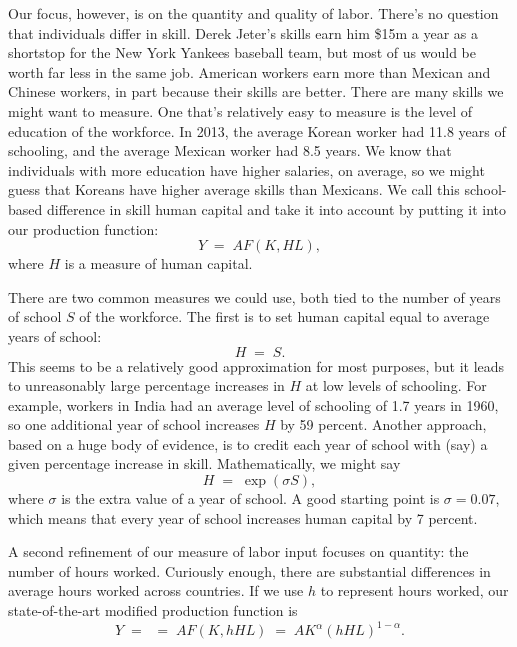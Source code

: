 Our focus, however, is on the quantity and quality of labor.
There's no question that individuals differ in skill.
Derek Jeter's skills earn him
\$15m a year as a shortstop for the New York Yankees baseball team,
but most of us would be worth far less in the same job.
American workers earn more than Mexican and Chinese workers,
in part because their skills are better.
There are many skills we might want to measure.
One that's relatively easy to measure is the level of education of the
workforce.
In 2013, the average Korean worker had 11.8 years of
schooling, and the average Mexican worker had 8.5 years. We know
that individuals with more education have higher salaries, on
average, so we might guess that Koreans have higher average skills
than Mexicans. We call this school-based difference in skill
human capital and take it into account by putting
it into our production function:
\[
    Y \;=\; A F(K,HL),
\]
where $H$ is a measure of human capital.


There are two common measures we could use,
both tied to the number of years of school $S$ of the workforce.
The first is to set human capital equal to average years of school:
\[
    H \;=\; S .
\]
This seems to be a relatively good approximation for most purposes,
but it leads to unreasonably large percentage increases in $H$
at low levels of schooling.
For example, workers in India had an average level of schooling
of 1.7 years in 1960,
so one additional year of school increases $H$ by 59 percent.
Another approach, based on a huge body of evidence,
is to credit each year of school with (say) a given percentage
increase in skill.
Mathematically, we might say
\[
    H \;=\; \exp( \sigma S ) ,
\]
where $\sigma$ is the extra value of a year of school.
A good starting point is $\sigma = 0.07$,
which means that every year of school increases
human capital by 7 percent.


A second refinement of our measure of labor input focuses on quantity:
the number of hours worked.
Curiously enough, there are substantial differences
in average hours worked across countries.
If we use $h$ to represent hours worked, our state-of-the-art
modified production function is
\begin{equation}
    Y \;=\; \;=\; A F(K,hHL)
      \;=\;  A K^{\alpha} (hHL)^{1-\alpha}.
      \label{eq:pf-mod}
\end{equation}



